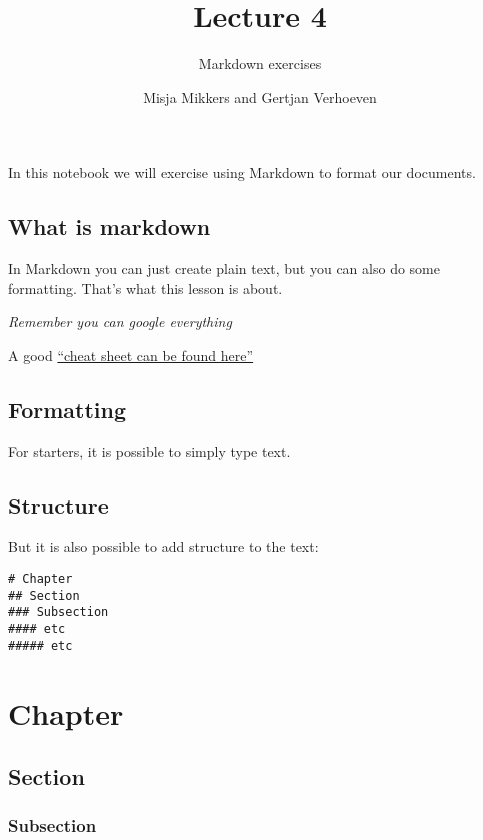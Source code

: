 \documentclass[
]{article}
\title{Lecture 4}
\subtitle{Markdown exercises}
\author{Misja Mikkers and Gertjan Verhoeven}
\date{}
\begin{document}
\maketitle

In this notebook we will exercise using Markdown to format our
documents.

\hypertarget{what-is-markdown}{%
\subsection{What is markdown}\label{what-is-markdown}}

In Markdown you can just create plain text, but you can also do some
formatting. That's what this lesson is about.

\emph{Remember you can google everything}

A good
\href{https://raw.githubusercontent.com/rstudio/cheatsheets/master/rmarkdown-2.0.pdf}{``cheat
sheet can be found here''}

\hypertarget{formatting}{%
\subsection{Formatting}\label{formatting}}

For starters, it is possible to simply type text.

\hypertarget{structure}{%
\subsection{Structure}\label{structure}}

But it is also possible to add structure to the text:

\begin{verbatim}
# Chapter
## Section
### Subsection
#### etc
##### etc
\end{verbatim}

\hypertarget{chapter}{%
\section{Chapter}\label{chapter}}

\hypertarget{section}{%
\subsection{Section}\label{section}}

\hypertarget{subsection}{%
\subsubsection{Subsection}\label{subsection}}
\end{document}
